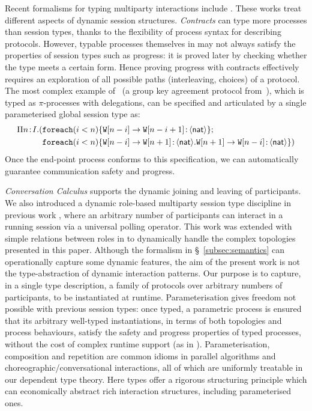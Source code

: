 \documentclass{LMCS}
\newcommand{\kf}[1]{\textup{\textsf{#1}}\xspace}
\newcommand{\Nat}{\kf{nat}}
\newcommand{\ENCan}[1]{\langle #1 \rangle}
\newcommand{\TO}[2]{#1\to #2}
\newcommand{\GS}[3]{\TO{#1}{#2}\colon \!\ENCan{#3}}
\newcommand{\W}{\ensuremath{\mathtt{W}}}
\newcommand{\AT}[2]{#1\! : \! #2}
\newcommand{\FOREACH}[3]{\ensuremath{\mathtt{foreach}(#1 #2)\{#3\}}}
\begin{document}
Recent formalisms for typing multiparty interactions include
\cite{CP09,CairesV09}.
These works treat different aspects of dynamic session structures.
{\em Contracts} \cite{CP09} can type more processes
than session types, thanks to the flexibility of process syntax
for describing protocols.
However, typable processes themselves in \cite{CP09} may
not always satisfy the properties of session types such as progress: it is
proved later by checking whether the type meets a certain form.  Hence
proving progress with contracts effectively
requires an exploration of all possible paths (interleaving, choices)
of a protocol.  The most complex example of~\cite[\S~3]{CP09} (a group
key agreement protocol from~\cite{AST98}), which is typed as
$\pi$-processes with delegations, can be specified and articulated
by a single parameterised
global session type as:
{\small
\begin{align*}
\label{group}
 \Pi \AT{n}{I}.(& \FOREACH{i}{<n}{\GS{\W[n-i]}{\W[n-i+1]}{\Nat}};\\
               & \FOREACH{i}{<n}{\GS{\W[n-i]}{\W[n+1]}{\Nat}.\GS{\W[n+1]}{\W[n-i]}{\Nat}})
\end{align*}
}
Once the end-point process conforms to this specification, we can
automatically guarantee communication safety and progress.




{\em  Conversation Calculus} \cite{CairesV09} supports the dynamic
joining and leaving of participants.
We also introduced a dynamic role-based multiparty session type
discipline in previous work \cite{DY11}, where an arbitrary number of participants can
interact in a running session via a universal polling operator. This
work was extended with simple relations between roles
in \cite{Poon11} to dynamically handle
the complex topologies presented in this paper.
Although the formalism in \S~\ref{subsec:semantics} can operationally capture some dynamic
features, the aim of the present work is
not
the type-abstraction
of dynamic interaction patterns. Our purpose is
to capture, in a single type description, a family
of protocols over arbitrary numbers of participants,
to be instantiated at runtime.
Parameterisation gives freedom not possible with previous session
types: once typed, a parametric process is ensured that its arbitrary
well-typed instantiations, in terms of both topologies and process
behaviours, satisfy the safety and progress properties of typed
processes, without the cost of complex runtime support (as in \cite{DY11}).
Parameterisation, composition and repetition are common idioms in
parallel algorithms and choreographic/conversational interactions, all
of which are uniformly treatable in our dependent type theory. Here
types offer a rigorous structuring principle which can economically
abstract rich interaction structures, including parameterised ones.
\end{document}
